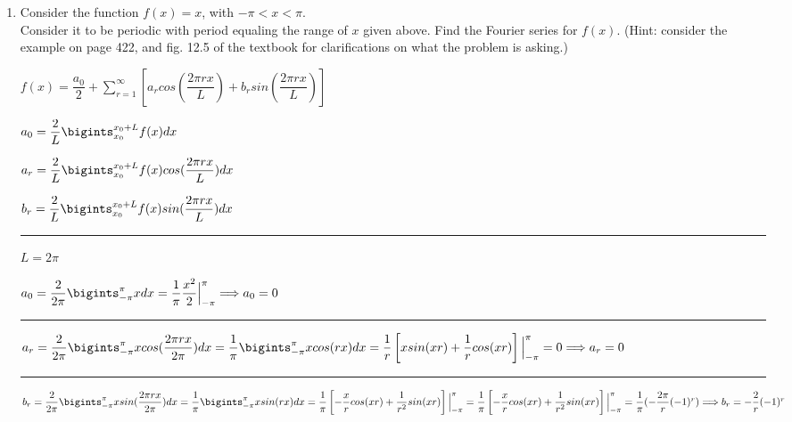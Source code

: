 \documentclass[fleqn]{article}
\begin{document}
\begin{enumerate}
    \item Consider the function $f(x)=x$,  with $-\pi < x < \pi$. \\
      Consider it to be periodic with period equaling the range of $x$ given above. Find the Fourier series for $f(x)$. (Hint: consider the example on page 422, and fig. 12.5 of the textbook for clarifications on what the problem is asking.)

      \textcolor{hwColor}{
        $f(x)=\dfrac{a_0}{2}+\sum\limits_{r=1}^{\infty}\left[a_r cos(\dfrac{2\pi rx}{L})+b_r sin(\dfrac{2\pi rx}{L})\right]$
      }

      \textcolor{hwColor}{
        $
          a_0=\dfrac{2}{L}\bigints_{x_0}^{x_0+L} f(x)dx
        $
      }

      \textcolor{hwColor}{
        $
          a_r=\dfrac{2}{L}\bigints_{x_0}^{x_0+L} f(x)cos(\dfrac{2\pi rx}{L})dx
        $
      }

      \textcolor{hwColor}{
        $
          b_r=\dfrac{2}{L}\bigints_{x_0}^{x_0+L} f(x)sin(\dfrac{2\pi rx}{L})dx
        $
      }

      \textcolor{hwColor}{ 
        \rule{15cm}{0.4pt} 
      }

      \textcolor{hwColor}{
        $L=2\pi$
      }

      \textcolor{hwColor}{
        $
          a_0=\dfrac{2}{2\pi}\bigints_{-\pi}^{\pi}xdx=\dfrac{1}{\pi}\dfrac{x^2}{2}\Big|_{-\pi}^{\pi} \Longrightarrow a_0=0
        $
      }

      \textcolor{hwColor}{ 
        \rule{15cm}{0.4pt} 
      }

      \textcolor{hwColor}{
        $
          a_r=\dfrac{2}{2\pi}\bigints_{-\pi}^{\pi} xcos(\dfrac{2\pi rx}{2\pi})dx=\dfrac{1}{\pi}\bigints_{-\pi}^{\pi} xcos(rx)dx=\dfrac{1}{r}\left[xsin(xr)+\dfrac{1}{r}cos(xr)\right]\Big|_{-\pi}^{\pi}=0 \\
          \\
          \Longrightarrow a_r=0
        $
      }

      \textcolor{hwColor}{ 
        \rule{15cm}{0.4pt} 
      }

      \textcolor{hwColor}{
        $
          b_r=\dfrac{2}{2\pi}\bigints_{-\pi}^{\pi} xsin(\dfrac{2\pi rx}{2\pi})dx=\dfrac{1}{\pi}\bigints_{-\pi}^{\pi} xsin(rx)dx=\dfrac{1}{\pi}\left[-\dfrac{x}{r}cos(xr)+\dfrac{1}{r^2}sin(xr)\right]\Big|_{-\pi}^{\pi} \\
          \\
          =\dfrac{1}{\pi}\left[-\dfrac{x}{r}cos(xr)+\dfrac{1}{r^2}sin(xr)\right]\Big|_{-\pi}^{\pi}=\dfrac{1}{\pi}(-\dfrac{2\pi}{r}(-1)^r)
          \Longrightarrow b_r=-\dfrac{2}{r}(-1)^r
        $
      }


\end{enumerate}
\end{document}
